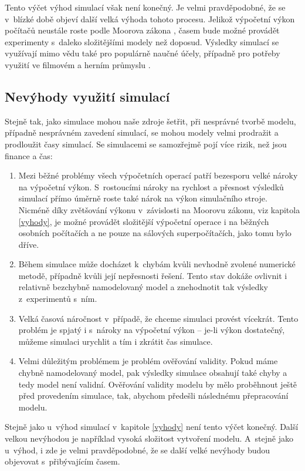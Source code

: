 Tento výčet výhod simulací však není konečný. Je velmi pravděpodobné, že se v~blízké době objeví další velká výhoda tohoto procesu. Jelikož výpočetní výkon počítačů neustále roste podle Moorova zákona \cite{Schaller1997}, časem bude možné provádět experimenty s~daleko složitějšími modely než doposud. Výsledky simulací se využívají mimo vědu také pro populárně naučné účely, případně pro potřeby využití ve filmovém a herním průmyslu \cite{James_2015}.

\subsection*{Nevýhody využití simulací}

Stejně tak, jako simulace mohou naše zdroje šetřit, při nesprávné tvorbě modelu, případně nesprávném zavedení simulací, se mohou modely velmi prodražit a prodloužit časy simulací. Se simulacemi se samozřejmě pojí více rizik, než jsou finance a čas:

\begin{enumerate}
    \item Mezi běžné problémy všech výpočetních operací patří bezesporu velké nároky na výpočetní výkon. S~rostoucími nároky na rychlost a přesnost výsledků simulací přímo úměrně roste také nárok na výkon simulačního stroje. Nicméně díky zvětšování výkonu v~závislosti na Moorovu zákonu, viz kapitola \ref{vyhody}, je možné provádět složitější výpočetní operace i na běžných osobních počítačích a ne pouze na sálových superpočítačích, jako tomu bylo dříve.
    \item Během simulace může docházet k~chybám kvůli nevhodně zvolené numerické metodě, případně kvůli její nepřesnosti řešení. Tento stav dokáže ovlivnit i relativně bezchybně namodelovaný model a znehodnotit tak výsledky z~experimentů s~ním.
    \item Velká časová náročnost v~případě, že chceme simulaci provést vícekrát. Tento problém je spjatý i s~nároky na výpočetní výkon -- je-li výkon dostatečný, můžeme simulaci urychlit a tím i zkrátit čas simulace.
    \item Velmi důležitým problémem je problém ověřování validity. Pokud máme chybně namodelovaný model, pak výsledky simulace obsahují také chyby a tedy model není validní. Ověřování validity modelu by mělo proběhnout ještě před provedením simulace, tak, abychom předešli následnému přepracování modelu.
\end{enumerate}

Stejně jako u~výhod simulací v~kapitole \ref{vyhody} není tento výčet konečný. Další velkou nevýhodou je například vysoká složitost vytvoření modelu. A~stejně jako u~výhod, i zde je velmi pravděpodobné, že se další velké nevýhody budou objevovat s~přibývajícím časem.

